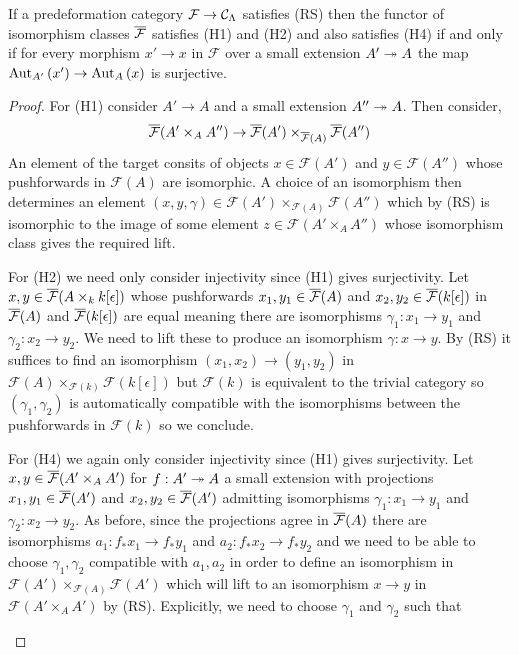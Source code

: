 \documentclass[12pt]{article}
\renewcommand{\F}{\mathcal{F}}
\begin{document}
\begin{prop}
If a predeformation category $\F \to \C_\Lambda$ satisfies (RS) then the functor of isomorphism classes $\ol{\F}$ satisfies (H1) and (H2) and also satisfies (H4) if and only if for every morphism $x' \to x$ in $\F$ over a small extension $A' \onto A$ the map $\Aut[A']{x'} \to \Aut[A]{x}$ is surjective.
\end{prop}

\begin{proof}
For (H1) consider $A' \to A$ and a small extension $A'' \onto A$. Then consider,
\[ \ol{\F}(A' \times_A A'') \to \ol{\F}(A') \times_{\ol{\F}(A)} \ol{\F}(A'') \]
An element of the target consits of objects $x \in \F(A')$ and $y \in \F(A'')$ whose pushforwards in $\F(A)$ are isomorphic. A choice of an isomorphism then determines an element $(x, y, \gamma) \in \F(A') \times_{\F(A)} \F(A'')$ which by (RS) is isomorphic to the image of some element $z \in \F(A' \times_A A'')$ whose isomorphism class gives the required lift. 
\par 
For (H2) we need only consider injectivity since (H1) gives surjectivity. Let $x,y \in \ol{\F}(A \times_k k[\epsilon])$ whose pushforwards $x_1, y_1 \in \ol{\F}(A)$ and $x_2, y_2 \in \ol{\F}(k[\epsilon])$ in $\ol{\F}(A)$ and $\ol{\F}(k[\epsilon])$ are equal meaning there are isomorphisms $\gamma_1 : x_1 \to y_1$ and $\gamma_2 : x_2 \to y_2$. We need to lift these to produce an isomorphism $\gamma : x \to y$. By (RS) it suffices to find an isomorphism $(x_1, x_2) \to (y_1, y_2)$ in $\F(A) \times_{\F(k)} \F(k[\epsilon])$ but $\F(k)$ is equivalent to the trivial category so $(\gamma_1, \gamma_2)$ is automatically compatible with the isomorphisms between the pushforwards in $\F(k)$ so we conclude. 
\par
For (H4) we again only consider injectivity since (H1) gives surjectivity. Let $x, y \in \ol{\F}(A' \times_A A')$ for $f : A' \onto A$ a small extension with projections $x_1, y_1 \in \ol{\F}(A')$ and $x_2, y_2 \in \ol{\F}(A')$ admitting isomorphisms $\gamma_1 : x_1 \to y_1$ and $\gamma_2 : x_2 \to y_2$. As before, since the projections agree in $\ol{\F}(A)$ there are isomorphisms $a_1 : f_* x_1 \to f_* y_1$ and $a_2 : f_* x_2 \to f_* y_2$ and we need to be able to choose $\gamma_1, \gamma_2$ compatible with $a_1, a_2$ in order to define an isomorphism in $\F(A') \times_{\F(A)} \F(A')$ which will lift to an isomorphism $x \to y$ in $\F(A' \times_A A')$ by (RS). Explicitly, we need to choose $\gamma_1$ and $\gamma_2$ such that 
\begin{center}

\end{center}
\end{proof}
\end{document}
